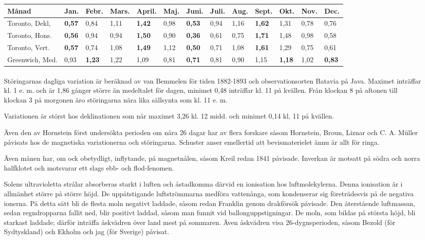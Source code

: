 \documentclass[a4paper, 12pt, oneside, swedish]{article}
\begin{document}
\begin{table}[H]
    \centering
    \footnotesize
    \begin{tabular}{l p{4mm} p{4mm} p{4mm} p{4mm} p{4mm} p{4mm} p{4mm} p{4mm} p{4mm} p{4mm} p{4mm} p{4mm}}
        Månad & Jan. & Febr. & Mars. & April. & Maj. & Juni. & Juli. & Aug. & Sept. & Okt. & Nov. & Dec. \\ \hline
        Toronto, Dekl, & \textbf{0,57} & 0,84 & 1,11 & \textbf{1,42} & 0,98 & \textbf{0,53} & 0,94 & 1,16 & \textbf{1,62} & 1,31 & 0,78 & 0,76 \\
        Toronto, Hons. & \textbf{0,56} & 0,94 & 0,94 & \textbf{1,50} & 0,90 & \textbf{0,36} & 0,61 & 0,75 & \textbf{1,71} & 1,48 & 0,98 & 0,58 \\
        Toronto, Vert. & \textbf{0,57} & 0,74 & 1,08 & \textbf{1,49} & 1,12 & \textbf{0,50} & 0,71 & 1,08 & \textbf{1,61} & 1,29 & 0,75 & 0,61 \\
        Greenwich, Med. & 0,93 & \textbf{1,23} & 1,22 & 1,09 & 0,81 & \textbf{0,71} & 0,81 & 0,90 & 1,15 & \textbf{1,18} & 1,02 & \textbf{0,83} \\
    \end{tabular}
\end{table}
\paragraph{}
Störingarnas dagliga variation är beräknad av van Bemmelen för tiden 1882-1893 och observationsorten Batavia på Java. Maximet inträffar kl. 1 e. m. och är 1,86 gånger större än medeltalet för dagen, minimet 0,48 inträffar kl. 11 på kvällen. Från klockan 8 på aftonen till klockan 3 på morgonen äro störingarna nära lika sällsynta som kl. 11 e. m.

Variationen är störst hos deklinationen som når maximet 3,26 kl. 12 midd. och minimet 0,14 kl, 11 på kvällen.

Även den av Hornstein först undersökta perioden om nära 26 dagar har av flera forskare såsom Hornstein, Broun, Liznar och C. A. Müller påvisats hos de magnetiska variationerna och störingarna. Schuster anser emellertid att bevismaterielet ännu är allt för ringa.

Även månen har, om ock obetydligt, inflytande, på magnetnålen, såsom Kreil redan 1841 påvisade. Inverkan är motsatt på södra och norra halfklotet och motsvarar ett slags ebb- och flod-fenomen.

Solens ultravioletta strålar absorberas starkt i luften och åstadkomma därvid en ionisation hos luftmolekylerna. Denna ionisation är i allmänhet större på större höjd. De uppåtstigande luftströmmarna medföra vattenånga, som kondenserar sig företrädesvis på de negativa ionerna. På detta sätt bli de flesta moln negativt laddade, såsom redan Franklin genom drakförsök påvisade. Den återstående luftmassan, sedan regndropparna fallit ned, blir positivt laddad, såsom man funnit vid ballonguppstigningar. De moln, som bildas på största höjd, bli starkast laddade; därför inträffa åskvädren över land mest på sommaren. Även åskvädren visa 26-dygnsperioden, såsom Bezold (för Sydtyskland) och Ekholm och jag (för Sverige) påvisat.
\end{document}
